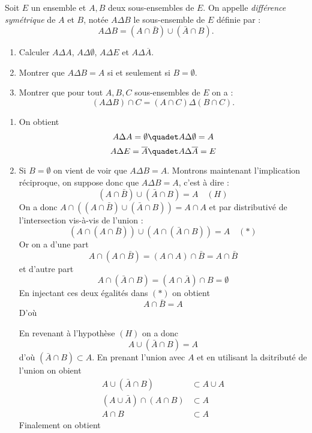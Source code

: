 \documentclass[a4paper, 11pt,reqno]{article}
\begin{document}
\begin{exercice}
Soit $E$ un ensemble et $A,B$ deux sous-ensembles de $E$. On appelle \emph{différence symétrique } de $A$ et $B$, notée $A\Delta B$ le sous-ensemble de $E$ définie par :
$$A \Delta  B =  (A\cap \bar{B})\cup \left(\bar{A}\cap B\right).$$
\begin{enumerate}
\item Calculer $A\Delta A$, $A\Delta \emptyset$, $A\Delta E$ et $A\Delta \overline{A}$.
\item Montrer que $A\Delta B= A$ si et seulement si $B=\emptyset.$
\item Montrer que pour tout $A,B,C$ sous-ensembles de $E$ on a :
$$(A\Delta B) \cap C = (A\cap C)\Delta (B\cap C).$$
\end{enumerate}
\end{exercice}
\begin{correction}
\begin{enumerate}
\item On obtient 
$$A\Delta A = \emptyset \quadet A\Delta \emptyset = A$$
$$A\Delta E  = \overline{A} \quadet A\Delta \overline{A} =E$$
\item Si $B=\emptyset$ on vient de voir que $A\Delta B= A$.  Montrons maintenant l'implication réciproque, on suppose donc que $A\Delta B =A$, c'est à dire :
$$ (A\cap \bar{B})\cup \left(\bar{A}\cap B\right) = A \quad (H) $$
On a donc $A \cap \left(  (A\cap \bar{B})\cup \left(\bar{A}\cap B\right)  \right) =A\cap A $
et par distributivé de l'intersection vis-à-vis de l'union : 
$$ \left( A\cap  (A\cap \bar{B})\right) \cup \left( A\cap \left(\bar{A}\cap B\right) \right)=A \quad (*) $$
Or  on a d'une part $$A\cap  (A\cap \bar{B}) = (A\cap A)\cap \bar{B}= A\cap \bar{B} $$ et  d'autre part 
$$A\cap \left(\bar{A}\cap B\right)  = (A\cap \bar{A} ) \cap B= \emptyset$$
En injectant ces deux égalités dans $(*)$ on obtient 
$$A\cap \bar{B} = A$$
D'où 

En revenant à l'hypothèse $(H)$ on a donc 
$$A \cup  \left(\bar{A}\cap B\right) = A$$
d'où $ \left(\bar{A}\cap B\right) \subset A$.  En prenant l'union avec $A$ et en utilisant la dsitributé de l'union on obient 
\begin{align*}
A \cup\left(\bar{A}\cap B\right) &\subset A \cup A\\
(A\cup \bar{A})\cap (A\cap B) &\subset A \\
A\cap B& \subset A
\end{align*}
Finalement on obtient 


\end{enumerate}
\end{correction}
\end{document}
